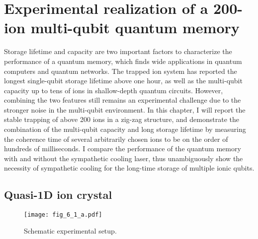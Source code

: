 
\chapter{Experimental realization of a 200-ion multi-qubit quantum memory}
\label{chap:experimental_realization_of_a_200_ion_multi_qubit_quantum_memory}

Storage lifetime and capacity are two important factors to characterize the performance of a quantum memory, which finds wide applications in quantum computers and quantum networks. The trapped ion system has reported the longest single-qubit storage lifetime above one hour, as well as the multi-qubit capacity up to tens of ions in shallow-depth quantum circuits. However, combining the two features still remains an experimental challenge due to the stronger noise in the multi-qubit environment. In this chapter, I will report the stable trapping of above 200 ions in a zig-zag structure, and demonstrate the combination of the multi-qubit capacity and long storage lifetime by measuring the coherence time of several arbitrarily chosen ions to be on the order of hundreds of milliseconds. I compare the performance of the quantum memory with and without the sympathetic cooling laser, thus unambiguously show the necessity of sympathetic cooling for the long-time storage of multiple ionic qubits.



\section{Quasi-1D ion crystal}

\begin{figure}
    \centering
    \texttt{[image: fig\_6\_1\_a.pdf]}
    \caption{Schematic experimental setup.}
    \label{fig:6_1_a}
\end{figure}

